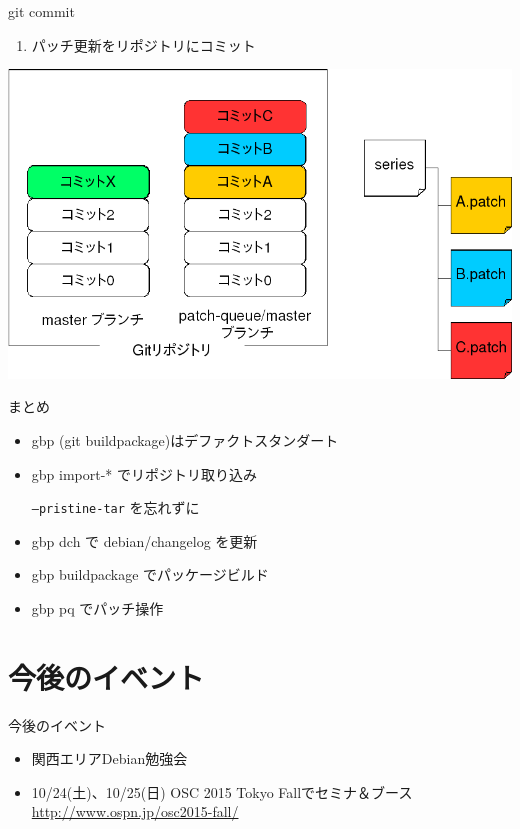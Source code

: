 \begin{frame}{git commit}
  \begin{enumerate}
   \item パッチ更新をリポジトリにコミット
  \end{enumerate}

\begin{center}
\includegraphics[width=0.8\hsize]{image201509/gbp-pq4.png}
\end{center}
\end{frame}

\begin{frame}{まとめ}

\begin{itemize}
\item gbp (git buildpackage)はデファクトスタンダート
\item gbp import-* でリポジトリ取り込み
  
  \texttt{--pristine-tar} を忘れずに
\item gbp dch で debian/changelog を更新
\item gbp buildpackage でパッケージビルド
\item gbp pq でパッチ操作
\end{itemize}


\end{frame}


\section{今後のイベント}
\begin{frame}{今後のイベント}
\begin{itemize}
 \item 関西エリアDebian勉強会
 \item 10/24(土)、10/25(日) OSC 2015 Tokyo Fallでセミナ＆ブース\\
\url{http://www.ospn.jp/osc2015-fall/}
\end{itemize}
\end{frame}

